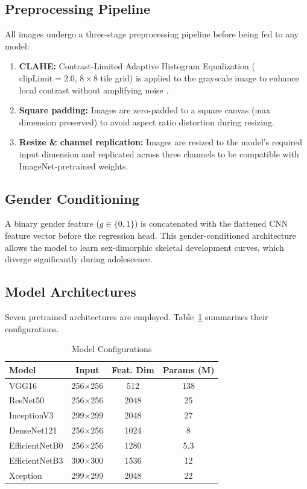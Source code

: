 \documentclass[conference]{IEEEtran}
\begin{document}
\subsection{Preprocessing Pipeline}

All images undergo a three-stage preprocessing pipeline before being
fed to any model:

\begin{enumerate}
  \item \textbf{CLAHE:} Contrast-Limited Adaptive Histogram Equalization
        ($\text{clipLimit}=2.0$, $8\times8$ tile grid) is applied to
        the grayscale image to enhance local contrast without amplifying
        noise \cite{pizer1987adaptive}.
  \item \textbf{Square padding:} Images are zero-padded to a square
        canvas (max dimension preserved) to avoid aspect ratio distortion
        during resizing.
  \item \textbf{Resize \& channel replication:} Images are resized to
        the model's required input dimension and replicated across three
        channels to be compatible with ImageNet-pretrained weights.
\end{enumerate}

\subsection{Gender Conditioning}

A binary gender feature ($g \in \{0, 1\}$) is concatenated with the
flattened CNN feature vector before the regression head. This
gender-conditioned architecture allows the model to learn
sex-dimorphic skeletal development curves, which diverge significantly
during adolescence.

\subsection{Model Architectures}

Seven pretrained architectures are employed. Table~\ref{tab:models}
summarizes their configurations.

\begin{table}[H]
\centering
\caption{Model Configurations}
\label{tab:models}
\renewcommand{\arraystretch}{1.2}
\begin{tabular}{lccc}
\toprule
\textbf{Model} & \textbf{Input} & \textbf{Feat. Dim} & \textbf{Params (M)} \\
\midrule
VGG16         & 256$\times$256 & 512  & 138 \\
ResNet50      & 256$\times$256 & 2048 & 25  \\
InceptionV3   & 299$\times$299 & 2048 & 27  \\
DenseNet121   & 256$\times$256 & 1024 & 8   \\
EfficientNetB0 & 256$\times$256 & 1280 & 5.3 \\
EfficientNetB3 & 300$\times$300 & 1536 & 12  \\
Xception      & 299$\times$299 & 2048 & 22  \\
\bottomrule
\end{tabular}
\end{table}
\end{document}
